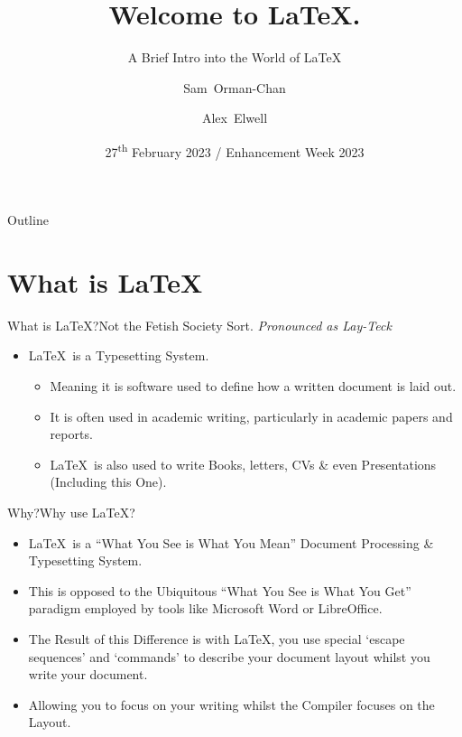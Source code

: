 \documentclass{beamer}
\title[] %
{Welcome to \LaTeX.}
\subtitle
{A Brief Intro into the World of \LaTeX} %
\author[] %
{Sam~Orman-Chan\inst{1} \and Alex~Elwell\inst{1}}
\institute[University of Lincoln] %
{
  \inst{1}%
  School of Computer Science}
\date[] %
{27\textsuperscript{th} February 2023 / Enhancement Week 2023}
\begin{document}
\begin{frame}
  \titlepage
\end{frame}

\begin{frame}{Outline}
  \tableofcontents
\end{frame}




\section{What is \LaTeX}

\begin{frame}{What is LaTeX?}{Not the Fetish Society Sort.}
\emph{Pronounced as Lay-Teck}
  \begin{itemize}
  \item
   \LaTeX~is a Typesetting System.
  \begin{itemize}\item Meaning it is software used to define how a written document is laid out.
  \item It is often used in academic writing, particularly in academic papers and reports.
  \item \LaTeX~is also used to write Books, letters, CVs \& even Presentations (Including this One).
   \end{itemize}
  \end{itemize}
\end{frame}

\begin{frame}{Why?}{Why use \LaTeX?}
\begin{itemize}
\item \LaTeX~is a ``What You See is What You Mean'' Document Processing \& Typesetting System.
\item This is opposed to the Ubiquitous ``What You See is What You Get'' paradigm employed by tools like Microsoft Word or LibreOffice.
\item The Result of this Difference is with \LaTeX, you use special `escape sequences' and `commands' to describe your document layout whilst you write your document. 
\item Allowing you to focus on your writing whilst the Compiler focuses on the Layout.
\end{itemize}
\end{frame}
\end{document}
